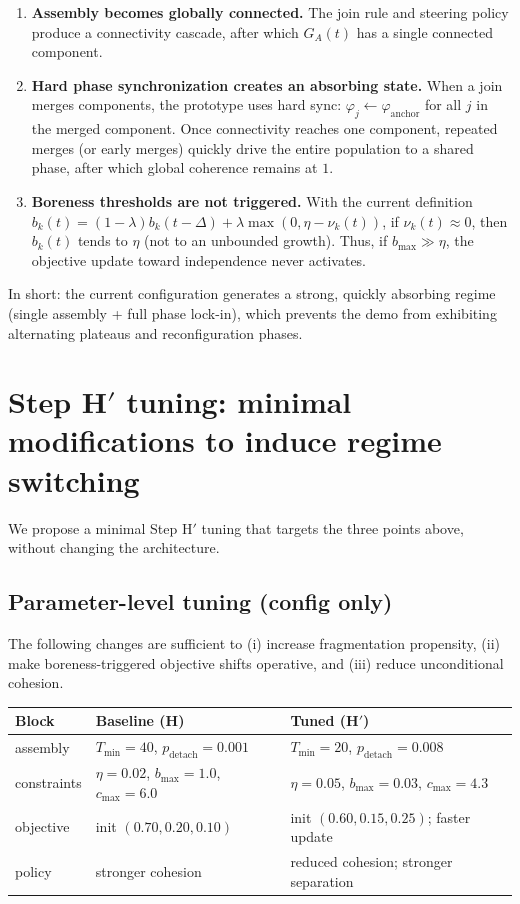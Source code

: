 \documentclass[11pt]{article}
\newcommand{\nov}{\nu}          %
\newcommand{\varph}{\varphi}    %
\begin{document}
\begin{enumerate}[leftmargin=2.2em]
\item \textbf{Assembly becomes globally connected.}
The join rule and steering policy produce a connectivity cascade, after which $G_A(t)$ has a single connected component.
\item \textbf{Hard phase synchronization creates an absorbing state.}
When a join merges components, the prototype uses hard sync:
$\varph_j \leftarrow \varph_{\text{anchor}}$ for all $j$ in the merged component.
Once connectivity reaches one component, repeated merges (or early merges) quickly drive the entire population to a shared phase,
after which global coherence remains at $1$.
\item \textbf{Boreness thresholds are not triggered.}
With the current definition
$b_k(t)=(1-\lambda)b_k(t-\Delta)+\lambda\max(0,\eta-\nov_k(t))$,
if $\nov_k(t)\approx 0$, then $b_k(t)$ tends to $\eta$ (not to an unbounded growth).
Thus, if $b_{\max}\gg \eta$, the objective update toward independence never activates.
\end{enumerate}

In short: the current configuration generates a strong, quickly absorbing regime (single assembly + full phase lock-in),
which prevents the demo from exhibiting alternating plateaus and reconfiguration phases.

\section{Step H$'$ tuning: minimal modifications to induce regime switching}
We propose a minimal Step H$'$ tuning that targets the three points above, without changing the architecture.

\subsection{Parameter-level tuning (config only)}
The following changes are sufficient to (i) increase fragmentation propensity, (ii) make boreness-triggered objective shifts operative,
and (iii) reduce unconditional cohesion.

\begin{center}
\begin{tabular}{@{}lll@{}}
\toprule
\textbf{Block} & \textbf{Baseline (H)} & \textbf{Tuned (H$'$)} \\
\midrule
assembly & $T_{\min}=40$, $p_{\text{detach}}=0.001$ & $T_{\min}=20$, $p_{\text{detach}}=0.008$ \\
constraints & $\eta=0.02$, $b_{\max}=1.0$, $c_{\max}=6.0$ & $\eta=0.05$, $b_{\max}=0.03$, $c_{\max}=4.3$ \\
objective & init $(0.70,0.20,0.10)$ & init $(0.60,0.15,0.25)$; faster update \\
policy & stronger cohesion & reduced cohesion; stronger separation \\
\bottomrule
\end{tabular}
\end{center}
\end{document}
